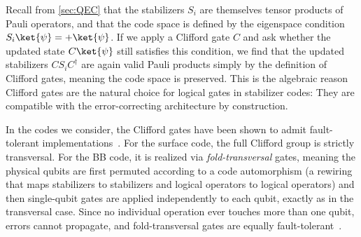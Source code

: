 Recall from \cref{sec:QEC} that the stabilizers $S_i$ are themselves tensor products of Pauli operators, and that the code space is defined by the eigenspace condition $S_i\ket{\psi} = +\ket{\psi}$. If we apply a Clifford gate $C$ and ask whether the updated state $C\ket{\psi}$ still satisfies this condition, we find that the updated stabilizers $CS_iC^\dagger$ are again valid Pauli products simply by the definition of Clifford gates, meaning the code space is preserved. This is the algebraic reason Clifford gates are the natural choice for logical gates in stabilizer codes: They are compatible with the error-correcting architecture by construction.

In the codes we consider, the Clifford gates have been shown to admit fault-tolerant implementations~\cite{Fowler_2012,eberhardt2024logicaloperatorsfoldtransversalgates,sayginel2025faulttolerantlogicalcliffordgates}. For the surface code, the full Clifford group is strictly transversal. For the BB code, it is realized via \emph{fold-transversal} gates, meaning the physical qubits are first permuted according to a code automorphism (a rewiring that maps stabilizers to stabilizers and logical operators to logical operators) and then single-qubit gates are applied independently to each qubit, exactly as in the transversal case. Since no individual operation ever touches more than one qubit, errors cannot propagate, and fold-transversal gates are equally fault-tolerant~\cite{eberhardt2024logicaloperatorsfoldtransversalgates,sayginel2025faulttolerantlogicalcliffordgates}.

